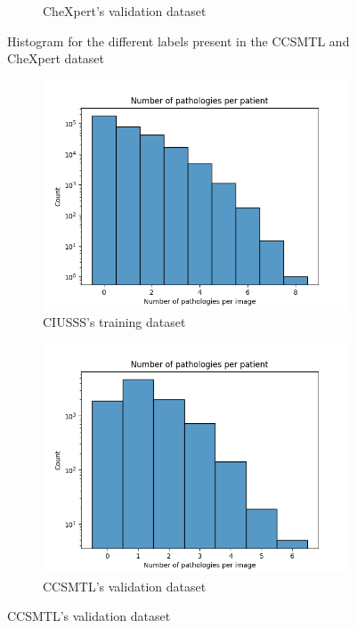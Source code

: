 \documentclass[11pt]{article}
\begin{document}
\begin{figure}[h!]
\begin{subfigure}[b]{0.45\linewidth}
         \caption{CheXpert's validation dataset}
         \vspace{4ex}
         \label{fig:chords_chexpert_valid}
     \end{subfigure}
     \label{fig:chords}
     \caption{Histogram for the different labels present in the CCSMTL and CheXpert dataset}

\end{figure}

\begin{figure}[H]
     \centering
     \begin{subfigure}[b]{0.45\linewidth}
         \centering
         \includegraphics[width=\linewidth]{plots/disease_count_ciusss_train}
         \caption{CIUSSS's training dataset}
         \vspace{4ex}
         \label{fig:count_ciusss_train}
     \end{subfigure}
     \hfill
     \begin{subfigure}[b]{0.45\linewidth}
         \centering
         \includegraphics[width=\linewidth]{plots/disease_count_ciusss_valid}
         \caption{CCSMTL's validation dataset}
         \vspace{4ex}
         \label{fig:count_ciusss_valid}
     \end{subfigure}



\end{figure}
\end{document}
